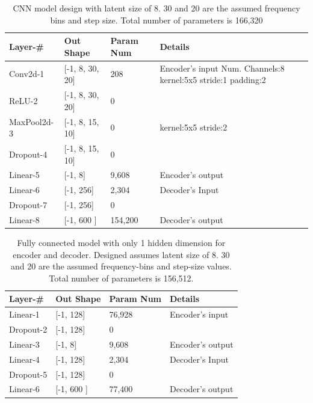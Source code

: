 \documentclass[\main/thesis.tex]{subfiles}
\begin{document}
\begin{table}[[h]
\begin{tabular}{|p{28mm}|p{25mm}|p{23mm}|p{50mm}|}
\hline
Layer-\# & Out Shape & Param Num & Details  \\ \hline
Conv2d-1 & [-1, 8, 30, 20] &   208 & Encoder's input \newline
Num. Channels:8\newline
kernel:5x5\newline                  
stride:1\newline    
padding:2 \\ \hline
ReLU-2 & [-1, 8, 30, 20] &   0 & \\  \hline
MaxPool2d-3 & [-1, 8, 15, 10] & 0 &  kernel:5x5 \newline
stride:2 \\ \hline
Dropout-4 & [-1, 8, 15, 10] & 0 &  \\ \hline
Linear-5 & [-1, 8] & 9,608 & Encoder's output \\ \hline
Linear-6 & [-1, 256] & 2,304 & Decoder's Input \\ \hline
Dropout-7 & [-1, 256] & 0 &  \\ \hline
Linear-8 & [-1, 600 ] &  154,200& Decoder's output\\ \hline
\end{tabular}
\caption{CNN model design with latent size of 8. 30 and 20 are the assumed frequency bins and step size. Total number of parameters is 166,320}
\label{table:CNNAUTOENCODER}
\end{table}

\begin{table}[[h]
\begin{tabular}{|p{28mm}|p{25mm}|p{23mm}|p{50mm}|}
\hline
Layer-\# & Out Shape & Param Num & Details  \\ \hline
Linear-1 & [-1, 128]  & 76,928 & Encoder's input \\ \hline
Dropout-2 & [-1, 128] & 0 &  \\ \hline
Linear-3 & [-1, 8] & 9,608 & Encoder's output \\ \hline
Linear-4 & [-1, 128] & 2,304 & Decoder's Input \\ \hline
Dropout-5 & [-1, 128]  & 0 &  \\ \hline
Linear-6  & [-1, 600 ] &  77,400 &Decoder's output\\ \hline
\end{tabular}
\caption{Fully connected model with only 1 hidden dimension for encoder and decoder. Designed assumes latent size of 8. 30 and 20 are the assumed frequency-bins and step-size values. Total number of parameters is 156,512.}
\label{table:FC1_AUTOENCODER}
\end{table}
\end{document}
